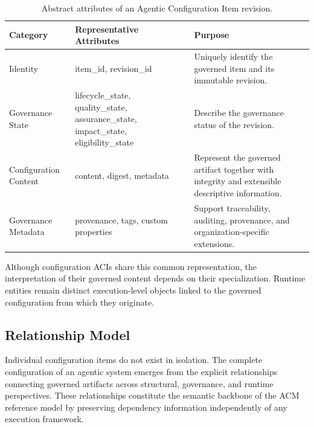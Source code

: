 \documentclass[10pt]{article}
\begin{document}
\begin{table}[t]
\centering
\caption{Abstract attributes of an Agentic Configuration Item revision.}
\label{tab:aci_attributes}

\renewcommand{\arraystretch}{1.15}

\begin{tabular}{p{3.3cm}p{3.4cm}p{8.3cm}}

\toprule

\textbf{Category} &
\textbf{Representative Attributes} &
\textbf{Purpose}

\\
\midrule

Identity &
item\_id, revision\_id &
Uniquely identify the governed item and its immutable revision.

\\

Governance State &
lifecycle\_state, quality\_state, assurance\_state, impact\_state, eligibility\_state &
Describe the governance status of the revision.

\\

Configuration Content &
content, digest, metadata &
Represent the governed artifact together with integrity and extensible descriptive information.

\\

Governance Metadata &
provenance, tags, custom properties &
Support traceability, auditing, provenance, and organization-specific extensions.

\\

\bottomrule

\end{tabular}

\end{table}

Although configuration ACIs share this common representation, the interpretation
of their governed content depends on their specialization. Runtime entities
remain distinct execution-level objects linked to the governed configuration
from which they originate.

\subsection{Relationship Model}
\label{sec:configuration_relationships}

Individual configuration items do not exist in isolation. The complete configuration of an agentic system emerges from the explicit relationships connecting governed artifacts across structural, governance, and runtime perspectives. These relationships constitute the semantic backbone of the ACM reference model by preserving dependency information independently of any execution framework.
\end{document}

